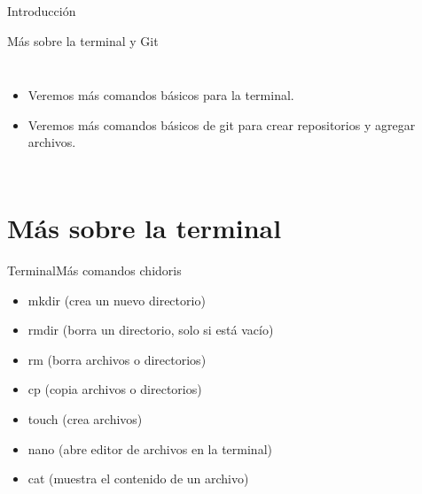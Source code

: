 \documentclass[10pt]{beamer}
\begin{document}
\begin{frame}{Introducción}{}
\begin{block}{Más sobre la terminal y Git}
\medskip
\begin{columns}[c]
\column{2in}
\begin{itemize}
    \item Veremos más comandos básicos para la terminal. 
    \item Veremos más comandos básicos de git para crear repositorios y agregar archivos.
\end{itemize}

\column{1.5in}
\end{columns}
\end{block}
\end{frame}

\section{Más sobre la terminal}

\begin{frame}{Terminal}{Más comandos chidoris}

\begin{block}{}

\begin{itemize}
        \item mkdir (crea un nuevo directorio)
        \item rmdir (borra un directorio, solo si está vacío)
        \item rm (borra archivos o directorios)
        \item cp (copia archivos o directorios)
        \item touch (crea archivos)
        \item nano (abre editor de archivos en la terminal)
        \item cat (muestra el contenido de un archivo)
\end{itemize}
    
\end{block}

\end{frame}
\end{document}

